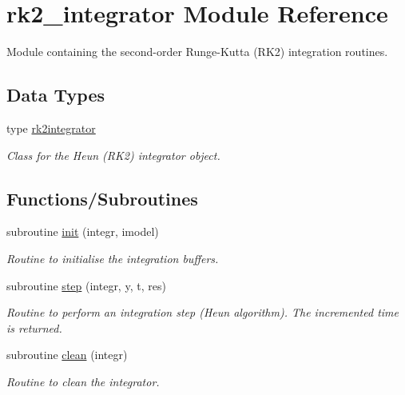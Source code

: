 \hypertarget{namespacerk2__integrator}{}\section{rk2\+\_\+integrator Module Reference}
\label{namespacerk2__integrator}


Module containing the second-\/order Runge-\/\+Kutta (R\+K2) integration routines.  


\subsection*{Data Types}
\begin{DoxyCompactItemize}
\item 
type \hyperlink{structrk2__integrator_1_1rk2integrator}{rk2integrator}
\begin{DoxyCompactList}\small\item\em Class for the Heun (R\+K2) integrator object. \end{DoxyCompactList}\end{DoxyCompactItemize}
\subsection*{Functions/\+Subroutines}
\begin{DoxyCompactItemize}
\item 
subroutine \hyperlink{namespacerk2__integrator_a1b91e270c5963d316f19ae12ffe35f79}{init} (integr, imodel)
\begin{DoxyCompactList}\small\item\em Routine to initialise the integration buffers. \end{DoxyCompactList}\item 
subroutine \hyperlink{namespacerk2__integrator_af90ce8bcd52238459d1367d39f898b12}{step} (integr, y, t, res)
\begin{DoxyCompactList}\small\item\em Routine to perform an integration step (Heun algorithm). The incremented time is returned. \end{DoxyCompactList}\item 
subroutine \hyperlink{namespacerk2__integrator_a4425dabc7bb2f6f999479c3ab64ab06e}{clean} (integr)
\begin{DoxyCompactList}\small\item\em Routine to clean the integrator. \end{DoxyCompactList}\end{DoxyCompactItemize}


